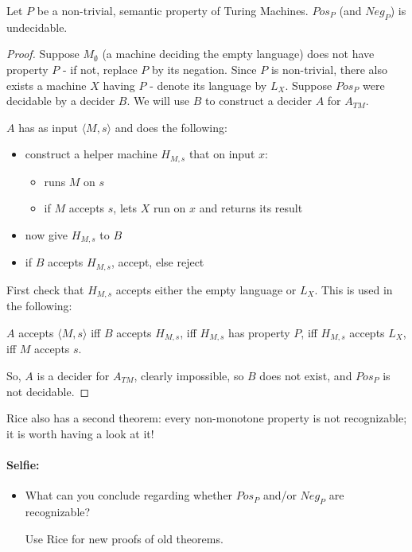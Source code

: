 \begin{theorem}
Let $P$ be a non-trivial, semantic property of Turing
Machines. $Pos_P$ (and $Neg_P$) is undecidable.
\end{theorem}
\begin{proof}
Suppose $M_\emptyset$ (a machine deciding the empty language) does not
have property $P$ - if not, replace $P$ by its negation. Since $P$ is
non-trivial, there also exists a machine $X$ having $P$ - denote
its language by $L_X$. Suppose $Pos_P$ were decidable by a decider
$B$. We will use $B$ to construct a decider $A$ for $A_{TM}$.

$A$ has as input $\langle M,s \rangle$ and does the following:
\begin{itemize}
\item construct a helper machine $H_{M,s}$ that on input $x$:

\begin{itemize}
\item runs $M$ on $s$
\item if $M$ accepts $s$, lets $X$ run on $x$ and returns its result
\end{itemize}

\item now give $H_{M,s}$ to $B$
\item if $B$ accepts $H_{M,s}$, accept, else reject
\end{itemize}
First check that $H_{M,s}$ accepts either the empty language or
$L_X$. This is used in the following:


$A$ accepts $\langle M,s \rangle$ iff $B$ accepts $H_{M,s}$, iff
%
$H_{M,s}$ has property $P$, iff
%
$H_{M,s}$ accepts $L_X$, iff
%
$M$ accepts $s$.

So, $A$ is a decider for $A_{TM}$, clearly impossible, so $B$ does not
exist, and $Pos_P$ is not decidable.
\end{proof}

Rice also has a second theorem: every non-monotone property is not
recognizable; it is worth having a look at it!

\paragraph{Selfie:}
\begin{itemize}
\item[]
What can you conclude regarding whether $Pos_P$ and/or $Neg_P$ are
recognizable?

Use Rice for new proofs of old theorems.
\end{itemize}


